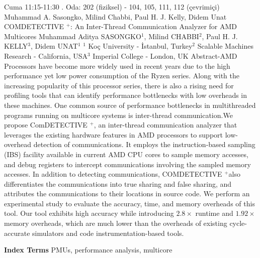 
    \begin{abstract_basarim}
    {Cuma 11:15-11:30}
    {.}
    {Oda: 202 (fiziksel) - 104, 105, 111, 112 (çevrimiçi)}
    {Muhammad A. Sasongko, Milind Chabbi, Paul H. J. Kelly, Didem Unat}
    {COMDETECTIVE $^{+}$: An Inter-Thread Communication Analyzer for AMD Multicores}
    {%
    Muhammad Aditya SASONGKO$^{1}$, Milind CHABBI$^{2}$, Paul H. J. KELLY$^{3}$, Didem UNAT$^{1}$}
    {%
    }
    {%
    $^1$ Koç University - İstanbul, Turkey\newline{}$^2$ Scalable Machines Research - California, USA\newline{}$^3$ Imperial College - London, UK}
    Abstract-AMD Processors have become more widely used in recent years due to the high performance yet low power consumption of the Ryzen series. Along with the increasing popularity of this processor series, there is also a rising need for profiling tools that can identify performance bottlenecks with low overheads in these machines. One common source of performance bottlenecks in multithreaded programs running on multicore systems is inter-thread communication.\newline We propose ComDETECTIVE ${ }^{+}$, an inter-thread communication analyzer that leverages the existing hardware features in AMD processors to support low-overhead detection of communications. It employs the instruction-based sampling (IBS) facility available in current AMD CPU cores to sample memory accesses, and debug registers to intercept communications involving the sampled memory accesses. In addition to detecting communications, COMDETECTIVE ${ }^{+}$also differentiates the communications into true sharing and false sharing, and attributes the communications to their locations in source code. We perform an experimental study to evaluate the accuracy, time, and memory overheads of this tool. Our tool exhibits high accuracy while introducing $2.8 \times$ runtime and $1.92 \times$ memory overheads, which are much lower than the overheads of existing cycle-accurate simulators and code instrumentation-based tools. 
    
            \textbf{Index Terms} \newline{}PMUs, performance analysis, multicore
    \end{abstract_basarim}
    